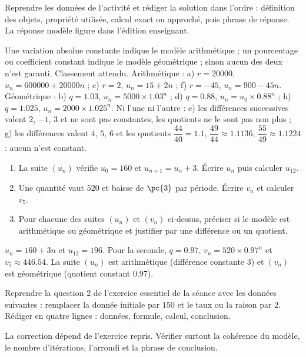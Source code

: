 \begin{example}
Reprendre les données de l'activité et rédiger la solution dans l'ordre : définition des objets, propriété utilisée, calcul exact ou approché, puis phrase de réponse. La réponse modèle figure dans l'édition enseignant.
\end{example}
\begin{solution}Une variation absolue constante indique le modèle arithmétique ; un pourcentage ou coefficient constant indique le modèle géométrique ; sinon aucun des deux n'est garanti. Classement attendu. Arithmétique : a) $r=\num{20000}$, $u_n=\num{600000}+\num{20000}n$ ; c) $r=2$, $u_n=15+2n$ ; f) $r=-45$, $u_n=900-45n$. Géométrique : b) $q=\num{1,03}$, $u_n=\num{5000}\times\num{1,03}^n$ ; d) $q=\num{0,88}$, $u_n=u_0\times\num{0,88}^n$ ; h) $q=\num{1,025}$, $u_n=\num{2000}\times\num{1,025}^n$. Ni l'une ni l'autre : e) les différences successives valent $2$, $-1$, $3$ et ne sont pas constantes, les quotients ne le sont pas non plus ; g) les différences valent $4$, $5$, $6$ et les quotients $\dfrac{44}{40}=\num{1,1}$, $\dfrac{49}{44}\approx\num{1,1136}$, $\dfrac{55}{49}\approx\num{1,1224}$ : aucun n'est constant.\end{solution}

\begin{exercise}[essentiel]
\begin{enumerate}\item La suite $(u_n)$ vérifie $u_0=160$ et $u_{n+1}=u_n+3$. Écrire $u_n$ puis calculer $u_{12}$.\item Une quantité vaut $520$ et baisse de $\pc{3}$ par période. Écrire $v_n$ et calculer $v_5$.\item Pour chacune des suites $(u_n)$ et $(v_n)$ ci-dessus, préciser si le modèle est arithmétique ou géométrique et justifier par une différence ou un quotient.\end{enumerate}
\end{exercise}
\begin{solution}$u_n=160+3n$ et $u_{12}=196$. Pour la seconde, $q=\num{0,97}$, $v_n=520\times\num{0,97}^n$ et $v_5\approx\num{446,54}$. La suite $(u_n)$ est arithmétique (différence constante $3$) et $(v_n)$ est géométrique (quotient constant $\num{0,97}$).\end{solution}


\begin{homework}Reprendre la question 2 de l'exercice essentiel de la séance avec les données suivantes : remplacer la donnée initiale par $150$ et le taux ou la raison par $2$. Rédiger en quatre lignes : données, formule, calcul, conclusion.\end{homework}
\begin{solution}La correction dépend de l'exercice repris. Vérifier surtout la cohérence du modèle, le nombre d'itérations, l'arrondi et la phrase de conclusion.\end{solution}

